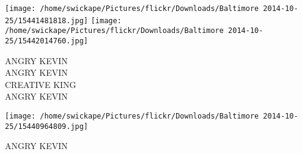 \documentclass[10pt,letterpaper]{article}
\begin{document}
\texttt{[image: /home/swickape/Pictures/flickr/Downloads/Baltimore 2014-10-25/15441481818.jpg]}
\texttt{[image: /home/swickape/Pictures/flickr/Downloads/Baltimore 2014-10-25/15442014760.jpg]}

ANGRY KEVIN\\
ANGRY KEVIN\\
CREATIVE KING\\
ANGRY KEVIN
\pagebreak

\texttt{[image: /home/swickape/Pictures/flickr/Downloads/Baltimore 2014-10-25/15440964809.jpg]}

ANGRY KEVIN
\pagebreak
\end{document}
